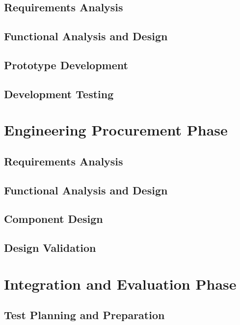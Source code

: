\documentclass[a4paper,11pt,fleqn]{report}
\begin{document}
\subsection{Requirements Analysis}

\subsection{Functional Analysis and Design}

\subsection{Prototype Development}

\subsection{Development Testing}

\section{Engineering Procurement Phase}

\subsection{Requirements Analysis}

\subsection{Functional Analysis and Design}

\subsection{Component Design}

\subsection{Design Validation}

\section{Integration and Evaluation Phase}

\subsection{Test Planning and Preparation}
\end{document}
